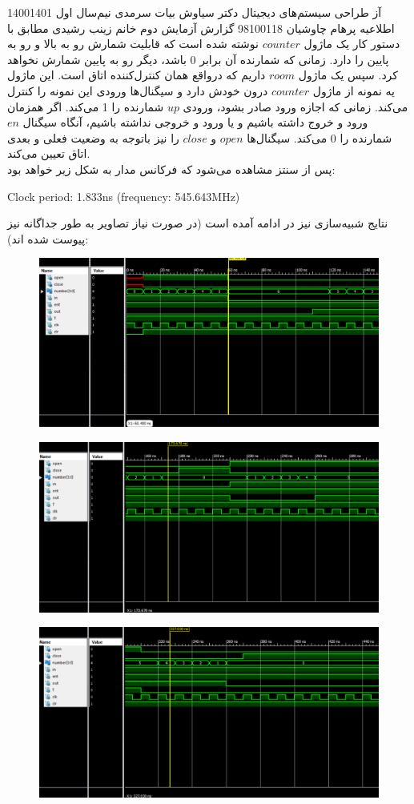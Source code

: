 \documentclass[a4paper,12pt]{article}
\begin{document}
\handout
{آز طراحی سیستم‌های دیجیتال}
{دکتر سیاوش بیات سرمدی}
{نیم‌سال اول 1400\lr{-}1401}
{اطلاعیه}
{پرهام چاوشیان}
{98100118}
 {گزارش آزمایش دوم}
{خانم زینب رشیدی}
مطابق با دستور کار یک ماژول
$counter$
نوشته شده است که قابلیت شمارش رو به بالا و رو به پایین را دارد. زمانی که شمارنده آن برابر 0 باشد، دیگر رو به پایین شمارش نخواهد کرد. سپس یک ماژول $room$ داریم که درواقع همان کنترل‌کننده اتاق است. این ماژول یه نمونه از ماژول $counter$ درون خودش دارد و سیگنال‌ها ورودی این نمونه را کنترل می‌کند. زمانی که اجازه ورود صادر بشود، ورودی $up$ شمارنده را 1 می‌کند. اگر همزمان ورود و خروج داشته باشیم و یا ورود و خروجی نداشته باشیم، آنگاه سیگنال $en$ شمارنده را 0 می‌کند. سیگنال‌ها $open$ و $close$ را نیز باتوجه به وضعیت فعلی و بعدی اتاق تعیین می‌کند.\\
پس از سنتز مشاهده می‌شود که فرکانس مدار به شکل زیر خواهد بود:
\begin{center}
\begin{latin}
Clock period: 1.833ns (frequency: 545.643MHz)
\end{latin}
\end{center}
نتایج شبیه‌سازی نیز در ادامه آمده است (در صورت نیاز تصاویر به طور جداگانه نیز پیوست شده اند):
\begin{figure}[H]
 \centering
  \includegraphics[width=0.8\linewidth]{s1}
\end{figure}
\begin{figure}[H]
 \centering
  \includegraphics[width=0.8\linewidth]{s2}
\end{figure}
\begin{figure}[H]
 \centering
  \includegraphics[width=0.8\linewidth]{s3}
\end{figure}
\end{document}
